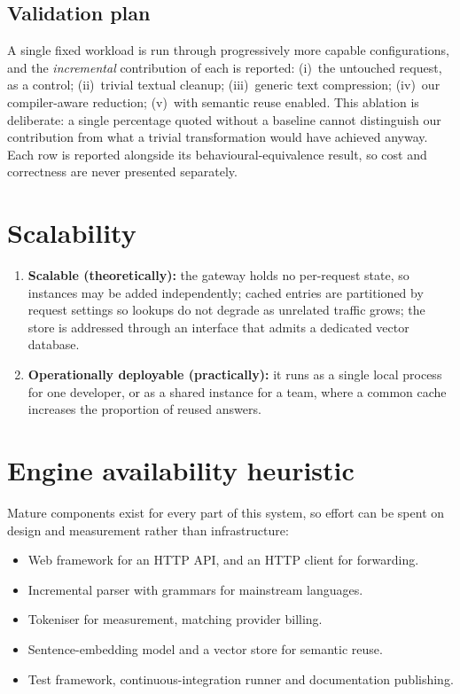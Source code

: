 \documentclass[11pt,a4paper]{article}
\begin{document}
\subsection{Validation plan}
A single fixed workload is run through progressively more capable
configurations, and the \emph{incremental} contribution of each is reported:
(i)~the untouched request, as a control; (ii)~trivial textual cleanup;
(iii)~generic text compression; (iv)~our compiler-aware reduction;
(v)~with semantic reuse enabled. This ablation is deliberate: a single
percentage quoted without a baseline cannot distinguish our contribution from
what a trivial transformation would have achieved anyway. Each row is reported
alongside its behavioural-equivalence result, so cost and correctness are never
presented separately.

\section{Scalability}

\begin{enumerate}[noitemsep]
  \item \textbf{Scalable (theoretically):} the gateway holds no per-request
        state, so instances may be added independently; cached entries are
        partitioned by request settings so lookups do not degrade as unrelated
        traffic grows; the store is addressed through an interface that admits a
        dedicated vector database.
  \item \textbf{Operationally deployable (practically):} it runs as a single
        local process for one developer, or as a shared instance for a team,
        where a common cache increases the proportion of reused answers.
\end{enumerate}

\section{Engine availability heuristic}

Mature components exist for every part of this system, so effort can be spent on
design and measurement rather than infrastructure:

\begin{itemize}[noitemsep]
  \item Web framework for an HTTP API, and an HTTP client for forwarding.
  \item Incremental parser with grammars for mainstream languages.
  \item Tokeniser for measurement, matching provider billing.
  \item Sentence-embedding model and a vector store for semantic reuse.
  \item Test framework, continuous-integration runner and documentation
        publishing.
\end{itemize}
\end{document}
